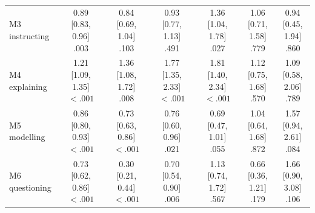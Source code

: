 \begin{table}[p]
{\begin{tabular}{lcccccc}
M3 instructing & \makecell{0.89 [0.83, 0.96]\\.003} & \makecell{0.84 [0.69, 1.04]\\.103} & \makecell{0.93 [0.77, 1.13]\\.491} & \makecell{1.36 [1.04, 1.78]\\.027} & \makecell{1.06 [0.71, 1.58]\\.779} & \makecell{0.94 [0.45, 1.94]\\.860} \\
M4 explaining & \makecell{1.21 [1.09, 1.35]\\$<.001$} & \makecell{1.36 [1.08, 1.72]\\.008} & \makecell{1.77 [1.35, 2.33]\\$<.001$} & \makecell{1.81 [1.40, 2.34]\\$<.001$} & \makecell{1.12 [0.75, 1.68]\\.570} & \makecell{1.09 [0.58, 2.06]\\.789} \\
M5 modelling & \makecell{0.86 [0.80, 0.93]\\$<.001$} & \makecell{0.73 [0.63, 0.86]\\$<.001$} & \makecell{0.76 [0.60, 0.96]\\.021} & \makecell{0.69 [0.47, 1.01]\\.055} & \makecell{1.04 [0.64, 1.68]\\.872} & \makecell{1.57 [0.94, 2.61]\\.084} \\
M6 questioning & \makecell{0.73 [0.62, 0.86]\\$<.001$} & \makecell{0.30 [0.21, 0.44]\\$<.001$} & \makecell{0.70 [0.54, 0.90]\\.006} & \makecell{1.13 [0.74, 1.72]\\.567} & \makecell{0.66 [0.36, 1.21]\\.179} & \makecell{1.66 [0.90, 3.08]\\.106} \\
\bottomrule
\end{tabular}%
}
\end{table}
